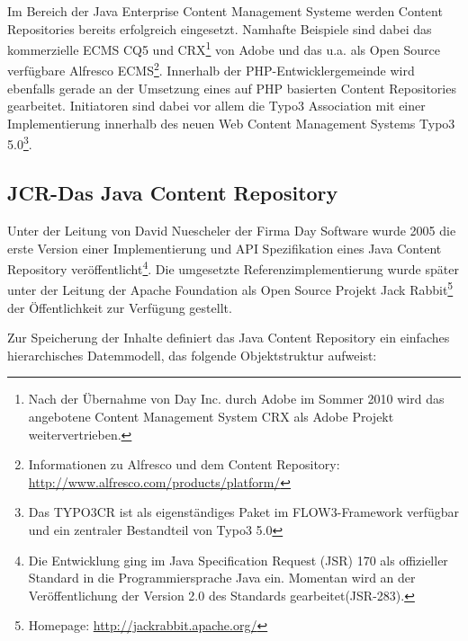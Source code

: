 Im Bereich der Java Enterprise Content Management Systeme werden Content Repositories bereits erfolgreich eingesetzt. Namhafte Beispiele sind dabei das kommerzielle ECMS CQ5 und CRX\footnote{Nach der Übernahme von Day Inc. durch Adobe im Sommer 2010 wird das angebotene Content Management System CRX als Adobe Projekt weitervertrieben.} von Adobe und das u.a. als Open Source verfügbare Alfresco ECMS\footnote{Informationen zu Alfresco und dem Content Repository: \href{http://www.alfresco.com/products/platform/}{http://www.alfresco.com/products/platform/}}.
Innerhalb der PHP-Entwicklergemeinde wird ebenfalls gerade an der Umsetzung eines auf PHP basierten Content Repositories gearbeitet. Initiatoren sind dabei vor allem die Typo3 Association mit einer Implementierung innerhalb des neuen Web Content Management Systems Typo3 5.0\footnote{Das TYPO3CR ist als eigenständiges Paket im FLOW3-Framework verfügbar und ein zentraler Bestandteil von Typo3 5.0}.


\subsection{JCR-Das Java Content Repository}

Unter der Leitung von David Nuescheler der Firma Day Software wurde 2005 die erste Version einer Implementierung und API Spezifikation eines Java Content Repository veröffentlicht\footnote{Die Entwicklung ging im Java Specification Request (JSR) 170 als offizieller Standard in die Programmiersprache Java ein. Momentan wird an der Veröffentlichung der Version 2.0 des Standards gearbeitet(JSR-283).}. Die umgesetzte Referenzimplementierung wurde später unter der Leitung der Apache Foundation als Open Source Projekt Jack Rabbit\footnote{Homepage: \href{http://jackrabbit.apache.org/}{http://jackrabbit.apache.org/}} der Öffentlichkeit zur Verfügung gestellt.

Zur Speicherung der Inhalte definiert das Java Content Repository ein einfaches hierarchisches Datemmodell, das folgende Objektstruktur aufweist:


